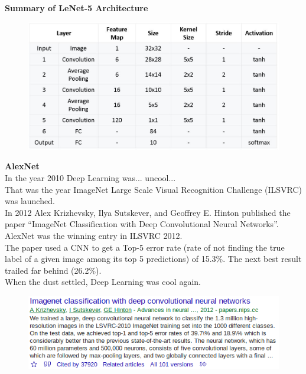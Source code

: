 \documentclass[10pt, compress]{beamer}
\begin{document}
\begin{frame}
  \vspace{0.6cm}
  \textbf{Summary of LeNet-5 Architecture} \\
  \begin{figure}
    \includegraphics[width=.75\linewidth]{imgs/cnn/LeNEt_Summary_Table}
  \end{figure}
\end{frame}

\begin{frame}
  \vspace{0.6cm}
  \textbf{AlexNet} \\ \hfill \break
  In the year 2010 Deep Learning was... uncool... \\ \hfill \break
  That was the year ImageNet Large Scale Visual Recognition Challenge (ILSVRC) was launched. \\
  In 2012 Alex Krizhevsky, Ilya Sutskever, and Geoffrey E. Hinton published the paper ``ImageNet Classification with Deep Convolutional Neural Networks”. \\
  AlexNet was the winning entry in ILSVRC 2012.\\
  The paper used a CNN to get a Top-5 error rate (rate of not finding the true label of a given image among its top 5 predictions) of 15.3\%. The next best result trailed far behind (26.2\%).\\
  When the dust settled, Deep Learning was cool again.
\end{frame}

\begin{frame}
  \begin{figure}
    \includegraphics[width=.85\linewidth]{imgs/cnn/scholar_alexnet}
  \end{figure}
\end{frame}
\end{document}
